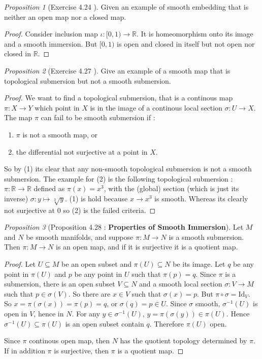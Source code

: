 \documentclass[a4paper]{article}
\theoremstyle{remark}
\newtheorem{prop}{Proposition}
\newcommand{\subhim}{\subseteq} %
\begin{document}
\begin{prop}[Exercise 4.24 \cite{LeeSM}]
Given an example of smooth embedding that is neither an open map nor a closed map.
\end{prop}
\begin{proof}
Consider inclusion map $\iota : [0,1) \to \mathbb{R}$. It is homeomorphism onto its image and a smooth immersion. But $[0,1)$ is open and closed in itself but not open nor closed in $\mathbb{R}$.
\end{proof}

\begin{prop}[Exercise 4.27 \cite{LeeSM}]
Give an example of a smooth map  that is topological submersion but not a smooth submersion.
\end{prop}
\begin{proof}
We want to find a topological submersion, that is a continous map $\pi : X \to Y$ which point in $X$ is in the image of a continous local section $\sigma : U \to X$. The map $\pi$ can fail to be smooth submersion if :
\begin{enumerate}[nolistsep]
\item[(1)]$\pi $ is not a smooth map, or
\item[(2)] the differential not surjective at a point in $X$.
\end{enumerate} 
So by (1) its clear that any non-smooth topological submersion is not a smooth submersion. The example for (2) is the following topological submersion : $\pi : \mathbb{R} \to \mathbb{R}$ defined as $\pi(x)=x^3$, with the (global) section (which is just its inverse) $\sigma : y \mapsto \sqrt[3]{y}$. (1) is hold because $x \to x^3$ is smooth. Whereas its clearly not surjective at $0$ so (2) is the failed criteria.
\end{proof}

\begin{prop}[Proposition 4.28 \cite{LeeSM} : \textbf{Properties of Smooth Immersion}]
Let $M$ and $N$ be smooth manifolds, and suppose $\pi : M \to N$ is a smooth submersion. Then $\pi : M \to N$ is an open map, and if it is surjective it is a quotient map.
\end{prop}
\begin{proof}
Let $U \subhim M$ be an open subset and $\pi(U)\subhim N$ be its image. Let $q$ be any point in $\pi(U)$ and $p$ be any point in $U$ such that $\pi(p) = q$. Since $\pi$ is a submersion, there is an open subset $V \subhim N$ and a smooth local section $\sigma : V \to M$ such that $p \in \sigma(V)$. So there are $x \in V$ such that $\sigma(x)=p$. But $\pi \circ \sigma = \text{Id}_V$. So $x = \pi (\sigma(x)) = \pi(p) = q$, or $\sigma(q) = p \in U$. Since $\sigma$ smooth, $\sigma^{-1}(U)$ is open in $V$, hence in $N$. For any $y \in \sigma^{-1}(U)$, $y = \pi (\sigma(y)) \in \pi(U)$. Hence $\sigma^{-1}(U) \subhim \pi(U)$ is an open subset contain $q$. Therefore $\pi(U)$ open.

Since $\pi$ continous open map, then $N$ has the quotient topology determined by $\pi$. If in addition $\pi$ is surjective, then $\pi$ is a quotient map.
\end{proof}
\end{document}
